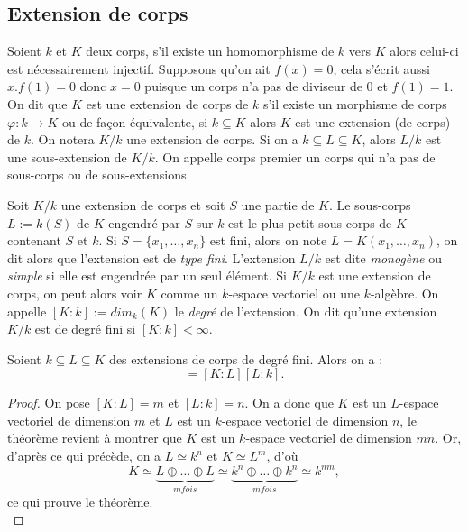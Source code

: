 \documentclass[a4paper]{article} %
\numberwithin{section}{part}
\numberwithin{equation}{section}
\begin{document}
\subsection{Extension de corps}
\label{def:degext}
Soient $k$ et $K$ deux corps, s'il existe un homomorphisme de $k$ vers $K$ alors
celui-ci est nécessairement injectif. Supposons qu'on ait $f(x) = 0$, cela
s'écrit aussi $x.f(1) = 0$ donc $x = 0$ puisque un corps n'a pas de diviseur de
$0$ et $f(1) = 1$. 
On dit que $K$ est une extension de corps de $k$ s'il existe un morphisme de 
corps $\varphi : k \to K$ ou de façon équivalente, si $k \subseteq K$ alors $K$
est une extension (de corps) de $k$. On notera $K/k$ une extension de corps.
Si on a $k\subseteq L \subseteq K$, alors $L/k$ est une sous-extension de
$K/k$. On appelle corps premier un corps qui n'a pas de sous-corps ou de
sous-extensions.\par
Soit $K/k$ une extension de corps et soit $S$ une partie de $K$. Le sous-corps 
$L := k(S)$ de $K$ engendré par $S$ sur $k$ est le plus petit sous-corps de $K$ 
contenant $S$ et $k$. Si $S = \lbrace x_1,\dots,x_n \rbrace$ est fini, alors on 
note $L = K(x_1,\dots,x_n)$, on dit alors que l'extension est de \emph{type
fini}. L'extension $L/k$ est dite \emph{monogène} ou \emph{simple} si elle est
engendrée par un seul élément. Si $K/k$ est une extension de corps, on peut
alors voir $K$ comme un $k$-espace vectoriel ou une $k$-algèbre. On appelle 
$[K:k] := dim_k(K)$ le \emph{degré} de l'extension. On dit qu'une extension 
$K/k$ est de degré fini si $[K:k] < \infty$.\par

\begin{thm}
Soient $k \subseteq L \subseteq K$ des extensions de corps de degré fini. Alors 
on a :
\begin{equation}
[K:k] = [K:L][L:k].
\end{equation}
\end{thm}
\begin{proof}
On pose $[K:L] = m$ et $[L:k] = n$. On a donc que $K$ est un $L$-espace 
vectoriel de dimension $m$ et $L$ est un $k$-espace vectoriel de dimension $n$, 
le théorème revient à montrer que $K$ est un $k$-espace vectoriel de dimension 
$mn$. Or, d'après ce qui précède, on a $L \simeq k^n$ et $K \simeq L^m$, d'où
\begin{equation}
K \simeq \underbrace{L \oplus\dots\oplus L}_{m fois}\simeq\underbrace
{k^n\oplus\dots\oplus k^n}_{m fois} \simeq k^{nm},
\end{equation}
ce qui prouve le théorème.\\
\end{proof}
\end{document}

